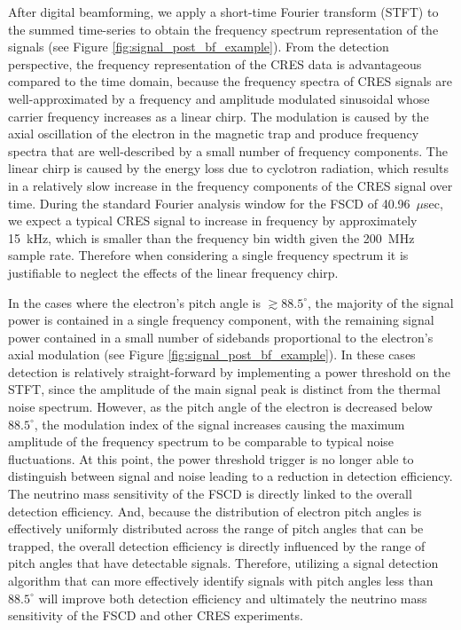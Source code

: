After digital beamforming, we apply a short-time Fourier transform (STFT) to the summed time-series to obtain the frequency spectrum representation of the signals (see Figure \ref{fig:signal_post_bf_example}). From the detection perspective, the frequency representation of the CRES data is advantageous compared to the time domain, because the frequency spectra of CRES signals are well-approximated by a frequency and amplitude modulated sinusoidal whose carrier frequency increases as a linear chirp. The modulation is caused by the axial oscillation of the electron in the magnetic trap and produce frequency spectra that are well-described by a small number of frequency components. The linear chirp is caused by the energy loss due to cyclotron radiation, which results in a relatively slow increase in the frequency components of the CRES signal over time. During the standard Fourier analysis window for the FSCD of 40.96~$\mu$sec, we expect a typical CRES signal to increase in frequency by approximately 15~kHz, which is smaller than the frequency bin width given the 200~MHz sample rate. Therefore when considering a single frequency spectrum it is justifiable to neglect the effects of the linear frequency chirp. 

In the cases where the electron's pitch angle is $\gtrsim 88.5^\circ$, the majority of the signal power is contained in a single frequency component, with the remaining signal power contained in a small number of sidebands proportional to the electron's axial modulation (see Figure \ref{fig:signal_post_bf_example}). In these cases detection is relatively straight-forward by implementing a power threshold on the STFT, since the amplitude of the main signal peak is distinct from the thermal noise spectrum. However, as the pitch angle of the electron is decreased below $88.5^\circ$, the modulation index of the signal increases causing the maximum amplitude of the frequency spectrum to be comparable to typical noise fluctuations. At this point, the power threshold trigger is no longer able to distinguish between signal and noise leading to a reduction in detection efficiency. The neutrino mass sensitivity of the FSCD is directly linked to the overall detection efficiency. And, because the distribution of electron pitch angles is effectively uniformly distributed across the range of pitch angles that can be trapped, the overall detection efficiency is directly influenced by the range of pitch angles that have detectable signals. Therefore, utilizing a signal detection algorithm that can more effectively identify signals with pitch angles less than $88.5^\circ$ will improve both detection efficiency and ultimately the neutrino mass sensitivity of the FSCD and other CRES experiments. 

